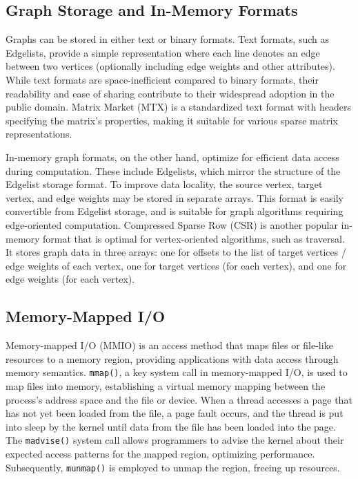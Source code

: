 \subsection{Graph Storage and In-Memory Formats}

Graphs can be stored in either text or binary formats. Text formats, such as Edgelists, provide a simple representation where each line denotes an edge between two vertices (optionally including edge weights and other attributes). While text formats are space-inefficient compared to binary formats, their readability and ease of sharing contribute to their widespread adoption in the public domain. Matrix Market (MTX) is a standardized text format with headers specifying the matrix's properties, making it suitable for various sparse matrix representations.

In-memory graph formats, on the other hand, optimize for efficient data access during computation. These include Edgelists, which mirror the structure of the Edgelist storage format. To improve data locality, the source vertex, target vertex, and edge weights may be stored in separate arrays. This format is easily convertible from Edgelist storage, and is suitable for graph algorithms requiring edge-oriented computation. Compressed Sparse Row (CSR) is another popular in-memory format that is optimal for vertex-oriented algorithms, such as traversal. It stores graph data in three arrays: one for offsets to the list of target vertices / edge weights of each vertex, one for target vertices (for each vertex), and one for edge weights (for each vertex).




\subsection{Memory-Mapped I/O}

Memory-mapped I/O (MMIO) is an access method that maps files or file-like resources to a memory region, providing applications with data access through memory semantics. \texttt{mmap()}, a key system call in memory-mapped I/O, is used to map files into memory, establishing a virtual memory mapping between the process's address space and the file or device. When a thread accesses a page that has not yet been loaded from the file, a page fault occurs, and the thread is put into sleep by the kernel until data from the file has been loaded into the page. The \texttt{madvise()} system call allows programmers to advise the kernel about their expected access patterns for the mapped region, optimizing performance. Subsequently, \texttt{munmap()} is employed to unmap the region, freeing up resources.

